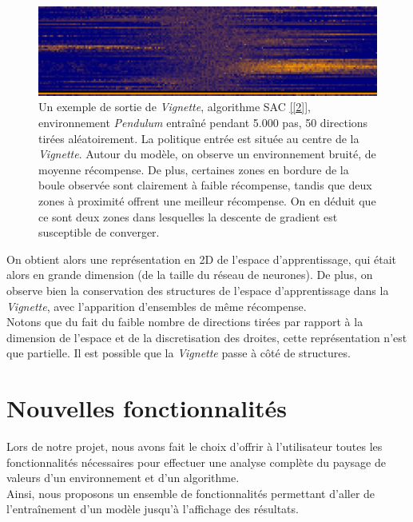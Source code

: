\documentclass[12pt]{article}
\begin{document}
\begin{figure}[htp]
    \centering
    \includegraphics[width=15cm]{Images/Vignette_pendulum}
    \caption{Un exemple de sortie de \emph{Vignette}, algorithme SAC  \ref{[2]}, environnement \emph{Pendulum} entraîné pendant 5.000 pas, 50 directions tirées aléatoirement. La politique entrée est située au centre de la \emph{Vignette}. Autour du modèle, on observe un environnement bruité, de moyenne récompense. De plus, certaines zones en bordure de la boule observée sont clairement à faible récompense, tandis que deux zones à proximité offrent une meilleur récompense. On en déduit que ce sont deux zones dans lesquelles la descente de gradient est susceptible de converger.}
    \label{fig:vignettePendulum}
\end{figure}

\newpage
On obtient alors une représentation en 2D de l’espace d’apprentissage, qui était alors en grande dimension (de la taille du réseau de neurones). De plus, on observe bien la conservation des structures de l'espace d'apprentissage dans la \emph{Vignette}, avec l'apparition d'ensembles de même récompense. \\

Notons que du fait du faible nombre de directions tirées par rapport à la dimension de l'espace et de la discretisation des droites, cette représentation n’est que partielle. Il est possible que la \emph{Vignette} passe à côté de structures. \\

\section{Nouvelles fonctionnalités}

Lors de notre projet, nous avons fait le choix d'offrir à l'utilisateur toutes les fonctionnalités nécessaires pour effectuer une analyse complète du paysage de valeurs d'un environnement et d'un algorithme. \\

Ainsi, nous proposons un ensemble de fonctionnalités permettant d'aller de l'entraînement d'un modèle jusqu'à l'affichage des résultats. \\
\end{document}
